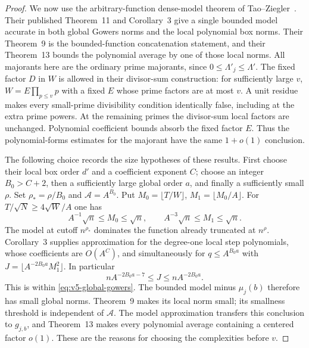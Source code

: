 \documentclass[11pt]{article}
\theoremstyle{definition}
\theoremstyle{remark}
\begin{document}
\begin{proof}
We now use the arbitrary-function dense-model theorem of
Tao--Ziegler~\cite{v5tz}. Their published Theorem~11 and Corollary~3
give a single bounded model accurate in both global Gowers norms and the
local polynomial box norms. Their Theorem~9 is the bounded-function
concatenation statement, and their Theorem~13 bounds the polynomial
average by one of those local norms. All majorants here are the ordinary
prime majorants, since $0\leq\Lambda'_j\leq\Lambda'$.
The fixed factor $D$ in $W$ is allowed in their divisor-sum construction:
for sufficiently large $v$, $W=E\prod_{p\leq v}p$ with a fixed $E$ whose
prime factors are at most $v$. A unit residue makes every small-prime
divisibility condition identically false, including at the extra prime
powers. At the remaining primes the divisor-sum local factors are
unchanged. Polynomial coefficient bounds absorb the fixed factor $E$.
Thus the polynomial-forms estimates for the majorant have the same
$1+o(1)$ conclusion.

The following choice records the size hypotheses of these results.
First choose their local box order $d'$ and a coefficient exponent $C$;
choose an integer $B_0>C+2$, then a sufficiently large global order $a$,
and finally a sufficiently small $\rho$. Set $\rho_* =\rho/B_0$ and
$\mathcal A=A^{B_0}$. Put
$M_0=\lfloor T/W\rfloor$, $M_1=\lfloor M_0/A\rfloor$.
For $T/\sqrt N\geq4\sqrt W/A$ one has
\[
 A^{-1}\sqrt n\leq M_0\leq\sqrt n,
 \qquad A^{-3}\sqrt n\leq M_1\leq\sqrt n.
\]
The model at cutoff $n^{\rho_*}$ dominates the function already truncated
at $n^\rho$. Corollary~3 supplies approximation for the degree-one local
step polynomials, whose coefficients are $O(A^C)$, and simultaneously for
$q\leq A^{B_0a}$ with
$J=\lfloor A^{-2B_0a}M_1^2\rfloor$.
In particular
\[
 nA^{-2B_0a-7}\leq J\leq nA^{-2B_0a}.
\]
This is within \eqref{eq:v5-global-gowers}. The bounded model minus
$\mu_j(b)$ therefore has small global norms. Theorem~9 makes its local
norm small; its smallness threshold is independent of $\mathcal A$.
The model approximation transfers this conclusion to $g_{j,b}$, and
Theorem~13 makes every polynomial average containing a centered factor
$o(1)$. These are the reasons for choosing the complexities before $v$.


\end{proof}
\end{document}
